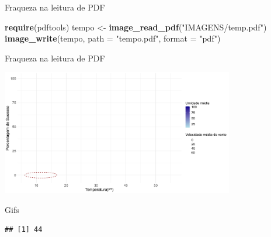 \documentclass[
  ignorenonframetext,
]{beamer}
\newenvironment{Shaded}{\begin{snugshade}}{\end{snugshade}}
\newcommand{\DataTypeTok}[1]{\textcolor[rgb]{0.13,0.29,0.53}{#1}}
\newcommand{\KeywordTok}[1]{\textcolor[rgb]{0.13,0.29,0.53}{\textbf{#1}}}
\newcommand{\NormalTok}[1]{#1}
\newcommand{\OperatorTok}[1]{\textcolor[rgb]{0.81,0.36,0.00}{\textbf{#1}}}
\newcommand{\StringTok}[1]{\textcolor[rgb]{0.31,0.60,0.02}{#1}}
\begin{document}
\begin{frame}[fragile]{Fraqueza na leitura de PDF}
\protect\hypertarget{fraqueza-na-leitura-de-pdf}{}

\begin{Shaded}
\begin{Highlighting}[]
\KeywordTok{require}\NormalTok{(pdftools)}
\NormalTok{tempo <-}\StringTok{ }\KeywordTok{image_read_pdf}\NormalTok{(}\StringTok{"IMAGENS/temp.pdf"}\NormalTok{)}
\KeywordTok{image_write}\NormalTok{(tempo, }\DataTypeTok{path =} \StringTok{"tempo.pdf"}\NormalTok{, }\DataTypeTok{format =} \StringTok{"pdf"}\NormalTok{)}
\end{Highlighting}
\end{Shaded}

\end{frame}

\begin{frame}{Fraqueza na leitura de PDF}
\protect\hypertarget{fraqueza-na-leitura-de-pdf-1}{}

\small

\includegraphics[width=4.0in]{tempo}

\begin{center}
\tiny{}
\end{center}

\end{frame}

\begin{frame}[fragile]{Gifs}
\protect\hypertarget{gifs}{}

\begin{Shaded}
\end{Shaded}

\begin{verbatim}
## [1] 44
\end{verbatim}

\end{frame}
\end{document}
